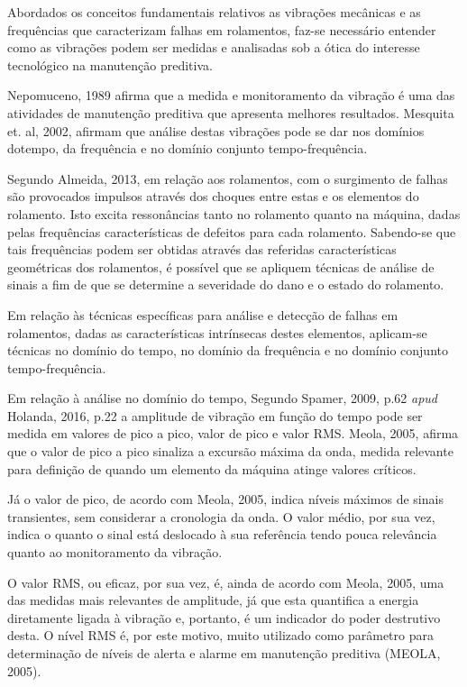 \documentclass[
	12pt,				
	oneside,			
	a4paper,			
	english,			
	brazil,			
	]{abntex2ppgsi}
\begin{document}
Abordados os conceitos  fundamentais relativos as vibrações mecânicas e as frequências que caracterizam falhas em rolamentos, faz-se necessário entender como as vibrações podem ser medidas e analisadas sob a ótica do interesse tecnológico na manutenção preditiva. 

Nepomuceno, 1989 afirma que a medida e monitoramento da vibração é uma das atividades de manutenção preditiva que apresenta melhores resultados. Mesquita et. al, 2002, afirmam que análise destas vibrações pode se dar nos domínios dotempo, da frequência e no domínio conjunto tempo-frequência.

Segundo Almeida, 2013, em relação aos rolamentos, com o surgimento de falhas são provocados impulsos através dos choques entre estas e os elementos do rolamento. Isto excita ressonâncias tanto no rolamento quanto na máquina, dadas pelas frequências características de defeitos para cada rolamento. Sabendo-se que tais frequências podem ser obtidas através das referidas características geométricas dos rolamentos, é possível que se apliquem técnicas de análise de sinais a fim de que se determine a severidade do dano e o estado do rolamento.

Em relação às técnicas específicas para análise e detecção de falhas em rolamentos, dadas as características intrínsecas destes elementos, aplicam-se técnicas no domínio do tempo, no domínio da frequência e no domínio conjunto tempo-frequência. 

Em relação à análise no domínio do tempo, Segundo Spamer, 2009, p.62 \textit{apud} Holanda, 2016, p.22 a amplitude de vibração em função do tempo pode ser medida em valores de pico a pico, valor de pico e valor RMS. Meola, 2005, afirma que o valor de pico a pico sinaliza a excursão máxima da onda, medida relevante para definição de quando um elemento da máquina atinge valores críticos. 

Já o valor de pico, de acordo com Meola, 2005, indica níveis máximos de sinais transientes, sem considerar a cronologia da onda. O valor médio, por sua vez, indica o quanto o sinal está deslocado à sua referência tendo pouca relevância quanto ao monitoramento da vibração. 

O valor RMS, ou eficaz, por sua vez, é, ainda de acordo com Meola, 2005, uma das medidas mais relevantes de amplitude, já que esta quantifica a energia diretamente ligada à vibração e, portanto, é um indicador do poder destrutivo desta. O nível RMS é, por este motivo, muito utilizado como parâmetro para determinação de níveis de alerta e alarme em manutenção preditiva (MEOLA, 2005).
\end{document}
